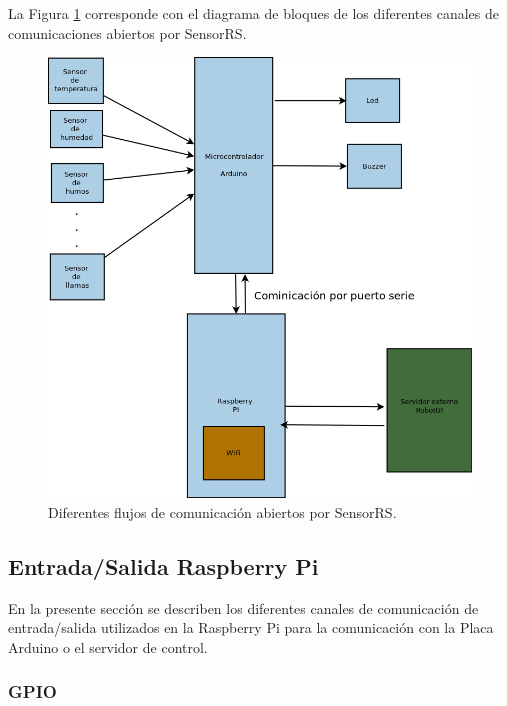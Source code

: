 La Figura \ref{figura:diagrama-comunicacion-robot} corresponde con el diagrama de bloques de los diferentes canales de comunicaciones abiertos por SensorRS.\\

\begin{figure}[H]
  \begin{center}
    \includegraphics[scale=0.4]{diagramas/diagrama_bloques_robot.png}
  \end{center}
  \caption{Diferentes flujos de comunicación abiertos por SensorRS.}
  \label{figura:diagrama-comunicacion-robot}
\end{figure}

\subsection{Entrada/Salida Raspberry Pi}


En la presente sección se describen los diferentes canales de comunicación de entrada/salida utilizados en la Raspberry Pi para la comunicación con la Placa Arduino o el servidor de control.\\

\subsubsection{GPIO}

